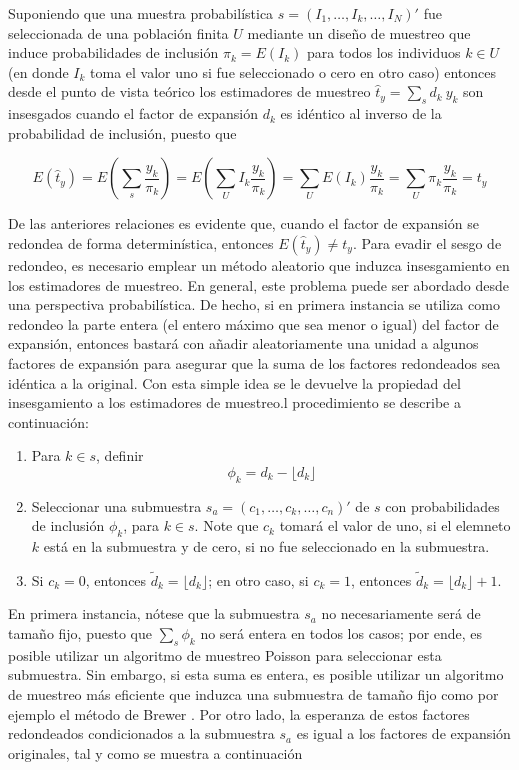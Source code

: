 \documentclass[
  12pt,
]{book}
\begin{document}
Suponiendo que una muestra probabilística \(s=(I_1,\ldots,I_k,\ldots,I_N)'\) fue seleccionada de una población finita \(U\) mediante un diseño de muestreo que induce probabilidades de inclusión \(\pi_k= E(I_k)\) para todos los individuos \(k \in U\) (en donde \(I_k\) toma el valor uno si fue seleccionado o cero en otro caso) entonces desde el punto de vista teórico los estimadores de muestreo \(\hat t_y = \sum_s d_k \ y_k\) son insesgados cuando el factor de expansión \(d_k\) es idéntico al inverso de la probabilidad de inclusión, puesto que

\[
E(\hat t_y)
= E \left( \sum_s \frac{y_k}{\pi_k} \right)
= E \left(\sum_U I_k \frac{y_k}{\pi_k} \right)
= \sum_U E(I_k)  \frac{y_k}{\pi_k}
= \sum_U \pi_k \frac{y_k}{\pi_k} = t_y
\]

De las anteriores relaciones es evidente que, cuando el factor de expansión se redondea de forma determinística, entonces \(E(\hat t_y) \neq t_y\). Para evadir el sesgo de redondeo, es necesario emplear un método aleatorio que induzca insesgamiento en los estimadores de muestreo. En general, este problema puede ser abordado desde una perspectiva probabilística. De hecho, si en primera instancia se utiliza como redondeo la parte entera (el entero máximo que sea menor o igual) del factor de expansión, entonces bastará con añadir aleatoriamente una unidad a algunos factores de expansión para asegurar que la suma de los factores redondeados sea idéntica a la original. Con esta simple idea se le devuelve la propiedad del insesgamiento a los estimadores de muestreo.l procedimiento se describe a continuación:

\begin{enumerate}
\def\labelenumi{\arabic{enumi}.}
\item
  Para \(k \in s\), definir
  \[\phi_k = d_k - \lfloor d_k \rfloor\]
\item
  Seleccionar una submuestra \(s_a=(c_1,\ldots,c_k,\ldots,c_n)'\) de \(s\) con probabilidades de inclusión \(\phi_k\), para \(k\in s\). Note que \(c_k\) tomará el valor de uno, si el elemneto \(k\) está en la submuestra y de cero, si no fue seleccionado en la submuestra.
\item
  Si \(c_k = 0\), entonces \(\tilde d_k = \lfloor d_k \rfloor\); en otro caso, si \(c_k = 1\), entonces \(\tilde d_k = \lfloor d_k \rfloor + 1\).
\end{enumerate}

En primera instancia, nótese que la submuestra \(s_a\) no necesariamente será de tamaño fijo, puesto que \(\sum_s\phi_k\) no será entera en todos los casos; por ende, es posible utilizar un algoritmo de muestreo Poisson \citep[sección 4.1]{Gutierrez_2016} para seleccionar esta submuestra. Sin embargo, si esta suma es entera, es posible utilizar un algoritmo de muestreo más eficiente que induzca una submuestra de tamaño fijo como por ejemplo el método de Brewer \citep{Tille2006}. Por otro lado, la esperanza de estos factores redondeados condicionados a la submuestra \(s_a\) es igual a los factores de expansión originales, tal y como se muestra a continuación
\end{document}
